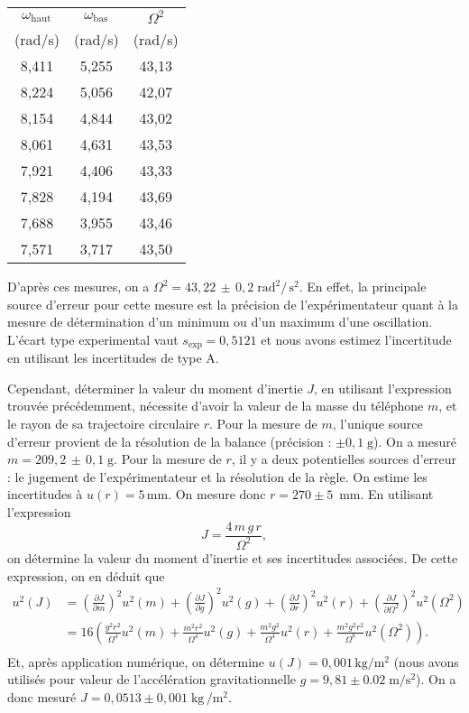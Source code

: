 \documentclass[a4paper]{report}
\begin{document}
	\begin{center}
		{\footnotesize
			\begin{tabular}{c|c|c}
				$\omega_{\text{haut}}$&$\omega_{\text{bas}}$&$\Omega^2$\\[-2mm]
				(rad/s)&(rad/s)&(rad/s)\\[1mm] \hline
				8,411&5,255&43,13\\[1mm]\hline
				8,224&5,056&42,07\\[1mm]\hline
				8,154&4,844&43,02\\[1mm]\hline
				8,061&4,631&43,53\\[1mm]\hline
				7,921&4,406&43,33\\[1mm]\hline
				7,828&4,194&43,69\\[1mm]\hline
				7,688&3,955&43,46\\[1mm]\hline
				7,571&3,717&43,50
			\end{tabular}
		}
	\end{center}

	D'après ces mesures, on a $\Omega^2 = 43,\!22\,\pm\, 0,\!2\; \text{rad}^2/\,\text{s}^2$. En effet, la principale source d'erreur pour cette mesure est la précision de l'expérimentateur quant à la mesure de détermination d'un minimum ou d'un maximum d'une oscillation. L'écart type experimental vaut $s_{\text{exp}} = 0,5121$ et nous avons estimez l'incertitude en utilisant les incertitudes de type A.

	Cependant, déterminer la valeur du moment d'inertie $J$, en utilisant l'expression trouvée précédemment, nécessite d'avoir la valeur de la masse du téléphone $m$, et le rayon de sa trajectoire circulaire $r$. Pour la mesure de $m$, l'unique source d'erreur provient de la résolution de la balance (précision : $\pm 0,\!1\;\text{g}$). On a mesuré $m = 209,\!2\,\pm\,0,\!1\; \text{g}$. Pour la mesure de $r$, il y a deux potentielles sources d'erreur : le jugement de l'expérimentateur et la résolution de la règle. On estime les incertitudes à $u(r) = 5\,\text{mm}$. On mesure donc $r = 270 \pm 5\,\text{ mm}$. En utilisant l'expression \[
		J = \frac{4\,m\,g\,r}{\Omega^2},
	\] on détermine la valeur du moment d'inertie et ses incertitudes associées. De cette expression, on en déduit que
	\begin{align*}
		u^2(J) &= \left( \frac{\partial J}{\partial m} \right)^2 u^2(m) + \left( \frac{\partial J}{\partial g} \right)^2 u^2(g) + \left( \frac{\partial J}{\partial r} \right)^2 u^2(r) + \left( \frac{\partial J}{\partial \Omega^2} \right)^2 u^2(\Omega^2)\\
		&= 16 \left(\frac{g^2r^2}{\Omega^4} u^2(m) + \frac{m^2r^2}{\Omega^4} u^2(g) + \frac{m^2g^2}{\Omega^4} u^2(r) + \frac{m^2g^2r^2}{\Omega^8} u^2(\Omega^2) \right).\\
	\end{align*}
	Et, après application numérique, on détermine $u(J) = 0,\!001\,\text{kg}/\text{m}^2$ (nous avons utilisés pour valeur de l'accélération gravitationnelle $g = 9,\!81 \pm 0.02\;\text{m}/\text{s}^2$). On a donc mesuré $J = 0,\!0513 \pm 0,\!001\;\text{kg}\,/\text{m}^2$.
\end{document}
